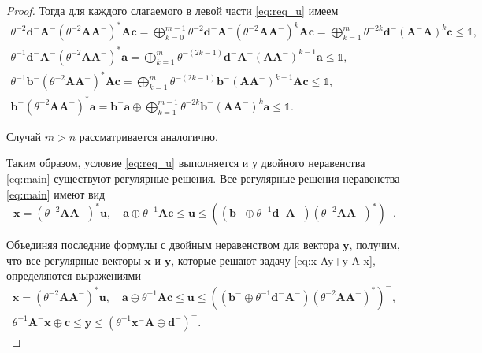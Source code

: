 \documentclass[specialist,
               substylefile = spbu.rtx,
               subf,href,colorlinks=true, 12pt]{disser}
\DeclareMathOperator{\Tr}{Tr}
\theoremstyle{definition}
\begin{document}
\begin{proof}
Тогда для каждого слагаемого в левой части \eqref{eq:req_u} имеем
\begin{gather*}
\theta^{-2}\bm{d}^{-}\bm{A}^{-}
(\theta^{-2}\bm{A}\bm{A}^{-})^{\ast}
\bm{A}\bm{c}
=
\bigoplus_{k=0}^{m-1}
\theta^{-2}\bm{d}^{-}\bm{A}^{-}
(\theta^{-2}\bm{A}\bm{A}^{-})^{k}
\bm{A}\bm{c}
=
\bigoplus_{k=1}^{m}\theta^{-2k}
\bm{d}^{-}(\bm{A}^{-}\bm{A})^{k}\bm{c}
\leq
\mathbb{1},\\
\theta^{-1}\bm{d}^{-}\bm{A}^{-}
(\theta^{-2}\bm{A}\bm{A}^{-})^{\ast}\bm{a}
=
\bigoplus_{k=1}^{m}
\theta^{-(2k-1)}\bm{d}^{-}\bm{A}^{-}(\bm{A}\bm{A}^{-})^{k-1}\bm{a}
\leq
\mathbb{1},\\
\theta^{-1}\bm{b}^{-}(\theta^{-2}\bm{A}\bm{A}^{-})^{\ast}\bm{A}\bm{c}
=
\bigoplus_{k=1}^{m}\theta^{-(2k-1)}\bm{b}^{-}(\bm{A}\bm{A}^{-})^{k-1}
\bm{A}\bm{c}
\leq\mathbb{1},\\
\bm{b}^{-}(\theta^{-2}\bm{A}\bm{A}^{-})^{\ast}\bm{a}
=
\bm{b}^{-}\bm{a}
\oplus
\bigoplus_{k=1}^{m-1}\theta^{-2k}\bm{b}^{-}(\bm{A}\bm{A}^{-})^{k}\bm{a}
\leq
\mathbb{1}.
\end{gather*}

Случай $m>n$ рассматривается аналогично.

Таким образом, условие \eqref{eq:req_u} выполняется и у двойного неравенства \eqref{eq:main} существуют регулярные решения. 
Все регулярные решения неравенства \eqref{eq:main} имеют вид
\begin{equation*}
\bm{x}=(\theta^{-2}\bm{A}\bm{A}^{-})^{\ast}\bm{u},
\quad
\bm{a}
\oplus
\theta^{-1}\bm{A}\bm{c}
\leq
\bm{u}
\leq
((\bm{b}^{-}\oplus\theta^{-1}\bm{d}^{-}\bm{A}^{-})(\theta^{-2}\bm{A}\bm{A}^{-})^{\ast})^{-}.
\end{equation*}

Объединяя последние формулы с двойным неравенством для вектора $\bm{y}$, получим, что все регулярные векторы $\bm{x}$ и $\bm{y}$, которые решают задачу \eqref{eq:x-Ay+y-A-x}, определяются выражениями
\begin{gather*}
\bm{x}=(\theta^{-2}\bm{A}\bm{A}^{-})^{\ast}\bm{u},
\quad
\bm{a}
\oplus
\theta^{-1}\bm{A}\bm{c}
\leq
\bm{u}
\leq
((\bm{b}^{-}\oplus\theta^{-1}\bm{d}^{-}\bm{A}^{-})(\theta^{-2}\bm{A}\bm{A}^{-})^{\ast})^{-},\\
\theta^{-1}\bm{A}^{-}\bm{x}\oplus\bm{c}
\leq
\bm{y}
\leq
(\theta^{-1}\bm{x}^{-}\bm{A}\oplus\bm{d}^{-})^{-}.
\end{gather*}
\end{proof}
\end{document}
